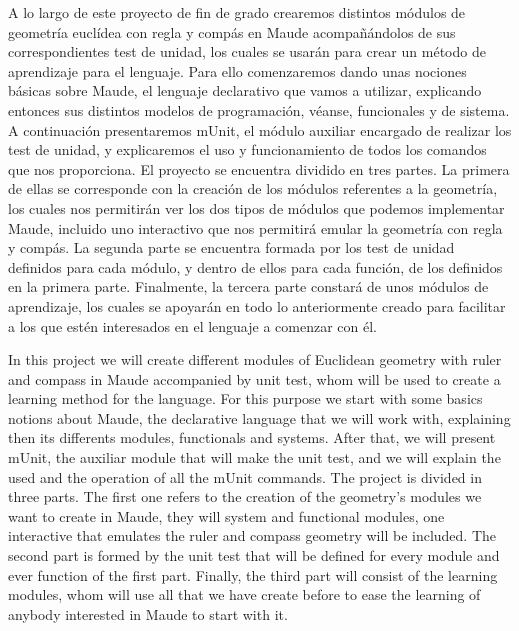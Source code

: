 
A lo largo de este proyecto de fin de grado crearemos distintos módulos de geometría euclídea con regla y compás en Maude acompañándolos de sus correspondientes test de unidad, los cuales se usarán para crear un método de aprendizaje para el lenguaje. Para ello comenzaremos dando unas nociones básicas sobre Maude, el lenguaje declarativo que vamos a utilizar, explicando entonces sus distintos modelos de programación, véanse, funcionales y de sistema. A continuación presentaremos mUnit, el módulo auxiliar encargado de realizar los test de unidad, y explicaremos el uso y funcionamiento de todos los comandos que nos proporciona. El proyecto se encuentra dividido en tres partes. La primera de ellas se corresponde con la creación de los módulos referentes a la geometría, los cuales nos permitirán ver los dos tipos de módulos que podemos implementar Maude, incluido uno interactivo que nos permitirá emular la geometría con regla y compás. La segunda parte se encuentra formada por los test de unidad definidos para cada módulo, y dentro de ellos para cada función, de los definidos en la primera parte. Finalmente, la tercera parte constará de unos módulos de aprendizaje, los cuales se apoyarán en todo lo anteriormente creado para facilitar a los que estén interesados en el lenguaje a comenzar con él. \par

In this project we will create different modules of Euclidean geometry with ruler and compass in Maude accompanied by unit test, whom will be used to create a learning method for the language. For this purpose we start with some basics notions about Maude, the declarative language that we will work with, explaining then its differents modules, functionals and systems. After that, we will present mUnit, the auxiliar module that will make the unit test, and we will explain the used and the operation of all the mUnit commands. The project is divided in three parts. The first one refers to the creation of the geometry's modules we want to create in Maude, they will system and functional modules, one interactive that emulates the ruler and compass geometry will be included. The second part is formed by the unit test that will be defined for every module and ever function of the first part. Finally, the third part will consist of the learning modules, whom will use all that we have create before to ease the learning of anybody interested in Maude to start with it. \par
